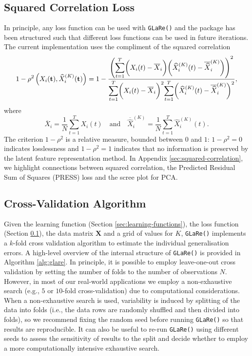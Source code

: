 \subsection{Squared Correlation Loss}\label{sec:loss-functions}

In principle, any loss function can be used with \texttt{GLaRe()} and the package has been structured such that different loss functions can be used in future iterations.
The current implementation uses the compliment of the squared correlation
$$
1- \rho^2 \left(X_i (\mathbf{t}), \widehat{X}^{(K)}_{i} (\mathbf{t}) \right) =
1 - \frac{\left( \mathlarger{\sum}_{t = 1}^T{\bigg(X_i (t) - \overline{X}_i \bigg) \bigg( \widehat{X}_i^{(K)} (t) - \overline{\widehat{X}}_i^{(K)} \bigg)} \right)^2}{\mathlarger{\sum}_{t = 1}^T \bigg(X_i (t) - \overline{X}_i \bigg)^2 \mathlarger{\sum}_{t = 1}^T \bigg( \widehat{X}_i^{(K)} (t) - \overline{\widehat{X}}_i^{(K)} \bigg) ^2},
$$
where
$$
\overline{X}_i = \frac{1}{N} \sum_{t=1}^T X_i (t) \quad \text{and} \quad \overline{\widehat{X}}_i^{(K)} = \frac{1}{N} \sum_{t=1}^T \widehat{X}_i^{(K)} (t).
$$
The criterion $1- \rho^2$ is a relative measure, bounded between $0$ and $1$: $1- \rho^2 = 0$ indicates losslessness and $1- \rho^2 = 1$ indicates that no information is preserved by the latent feature representation method.
In Appendix \ref{sec:squared-correlation}, we highlight connections between squared correlation, the Predicted Residual Sum of Squares (PRESS) loss and the scree plot for PCA.

\subsection{Cross-Validation Algorithm}

Given the learning function (Section \ref{sec:learning-functions}), the loss function (Section \ref{sec:loss-functions}), the data matrix $\mathbf{X}$ and a grid of values for $K$, \texttt{GLaRe()} implements a $k$-fold cross validation algorithm to estimate the individual generalisation errors. 
A high-level overview of the internal structure of \texttt{GLaRe()} is provided in Algorithm \ref{alg:glare}.
In principle, it is possible to employ leave-one-out cross validation by setting the number of folds to the number of observations $N$.
However, in most of our real-world applications we employ a non-exhaustive search (e.g., $5$ or $10$-fold cross-validation) due to computational considerations.
When a non-exhaustive search is used, variability is induced by splitting of the data into folds (i.e., the data rows are randomly shuffled and then divided into folds), so we recommend fixing the random seed before running \texttt{GLaRe()} so that results are reproducible.
It can also be useful to re-run \texttt{GLaRe()} using different seeds to assess the sensitivity of results to the split and decide whether to employ a more computationally intensive exhaustive search.




